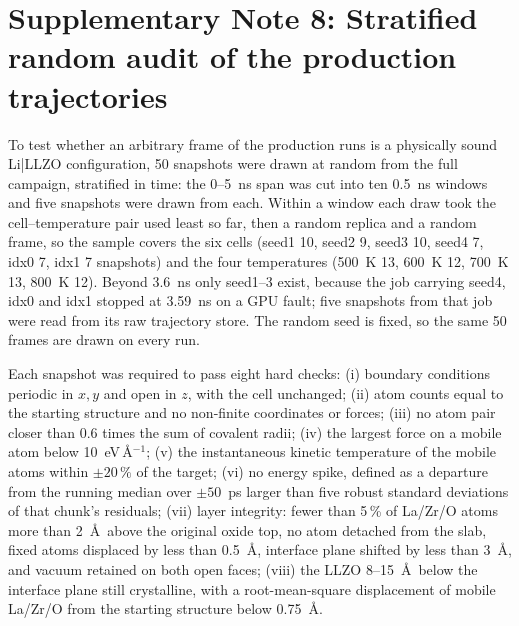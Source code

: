 \section*{Supplementary Note 8: Stratified random audit of the production trajectories}

To test whether an arbitrary frame of the production runs is a physically sound
Li|LLZO configuration, 50 snapshots were drawn at random from the full
campaign, stratified in time: the 0--5~ns span was cut into ten 0.5~ns
windows and five snapshots were drawn from each. Within a window each draw
took the cell--temperature pair used least so far, then a random replica and
a random frame, so the sample covers the six cells (seed1 10, seed2 9, seed3
10, seed4 7, idx0 7, idx1 7 snapshots) and the four temperatures (500~K 13,
600~K 12, 700~K 13, 800~K 12). Beyond 3.6~ns only seed1--3 exist, because the
job carrying seed4, idx0 and idx1 stopped at 3.59~ns on a GPU fault; five
snapshots from that job were read from its raw trajectory store. The random
seed is fixed, so the same 50 frames are drawn on every run.

Each snapshot was required to pass eight hard checks: (i) boundary conditions
periodic in $x,y$ and open in $z$, with the cell unchanged; (ii) atom counts
equal to the starting structure and no non-finite coordinates or forces;
(iii) no atom pair closer than 0.6 times the sum of covalent radii; (iv) the
largest force on a mobile atom below 10~eV\,\AA$^{-1}$; (v) the instantaneous
kinetic temperature of the mobile atoms within $\pm20\,\%$ of the target;
(vi) no energy spike, defined as a departure from the running median over
$\pm50$~ps larger than five robust standard deviations of that chunk's
residuals; (vii) layer integrity: fewer than 5\,\% of La/Zr/O atoms more than
2~\AA\ above the original oxide top, no atom detached from the slab, fixed
atoms displaced by less than 0.5~\AA, interface plane shifted by less than
3~\AA, and vacuum retained on both open faces; (viii) the LLZO 8--15~\AA\ below
the interface plane still crystalline, with a root-mean-square displacement of
mobile La/Zr/O from the starting structure below 0.75~\AA.

